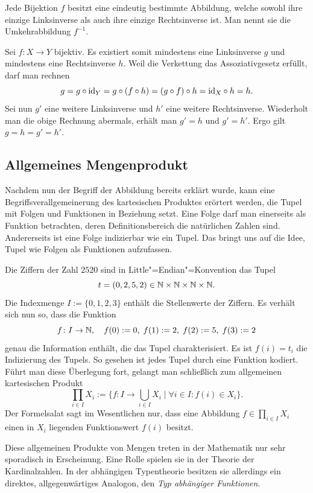 \begin{Satz}
Jede Bijektion $f$ besitzt eine eindeutig bestimmte Abbildung, welche
sowohl ihre einzige Linksinverse als auch ihre einzige Rechtsinverse
ist. Man nennt sie die Umkehrabbildung $f^{-1}$.
\end{Satz}
\begin{Beweis}
Sei $f\colon X\to Y$ bijektiv. Es existiert somit mindestens eine
Linksinverse $g$ und mindestens eine Rechtsinverse $h$. Weil die
Verkettung das Assoziativgesetz erfüllt, darf man rechnen
\[g = g\circ\operatorname{id}_Y = g\circ (f\circ h) = (g\circ f)\circ h
= {\operatorname{id}_X}\circ h = h.\]
Sei nun $g'$ eine weitere Linksinverse und $h'$ eine weitere
Rechtsinverse. Wiederholt man die obige Rechnung abermals, erhält man
$g'=h$ und $g'=h'$. Ergo gilt $g = h = g' = h'$.\,\qedsymbol
\end{Beweis}

\subsection{Allgemeines Mengenprodukt}

Nachdem nun der Begriff der Abbildung bereits erklärt wurde, kann eine
Begriffsverallgemeinerung des kartesischen Produktes erörtert werden,
die Tupel mit Folgen und Funktionen in Beziehung setzt. Eine Folge
darf man einerseits als Funktion betrachten, deren Definitionsbereich
die natürlichen Zahlen sind. Andererseits ist eine Folge indizierbar wie
ein Tupel. Das bringt uns auf die Idee, Tupel wie Folgen als Funktionen
aufzufassen.

Die Ziffern der Zahl $2520$ sind in Little"=Endian"=Konvention das Tupel
\[t=(0,2,5,2)\in\mathbb N\times\mathbb N\times\mathbb N\times\mathbb N.\]
Die Indexmenge $I:=\{0,1,2,3\}$ enthält die Stellenwerte der Ziffern.
Es verhält sich nun so, dass die Funktion
\[f\colon I\to\mathbb N,\quad f(0) := 0,\; f(1) := 2,\; f(2) := 5,\; f(3) := 2\]
genau die Information enthält, die das Tupel charakterisiert. Es ist
$f(i) = t_i$ die Indizierung des Tupels. So gesehen ist jedes Tupel durch
eine Funktion kodiert. Führt man diese Überlegung fort, gelangt man
schließlich zum allgemeinen kartesischen Produkt%
%
\[\prod_{i\in I} X_i := \{f\colon I\to\bigcup_{i\in I} X_i\mid
\forall i\in I\colon f(i)\in X_i\}.\]
Der Formelsalat sagt im Wesentlichen nur, dass eine Abbildung
$f\in\prod_{i\in I} X_i$ einen in $X_i$ liegenden Funktionswert
$f(i)$ besitzt.

Diese allgemeinen Produkte von Mengen treten in der Mathematik nur sehr
sporadisch in Erscheinung. Eine Rolle spielen sie in der Theorie der
Kardinalzahlen. In der abhängigen Typentheorie besitzen sie allerdings ein
direktes, allgegenwärtiges Analogon, den \emph{Typ abhängiger Funktionen}.%

